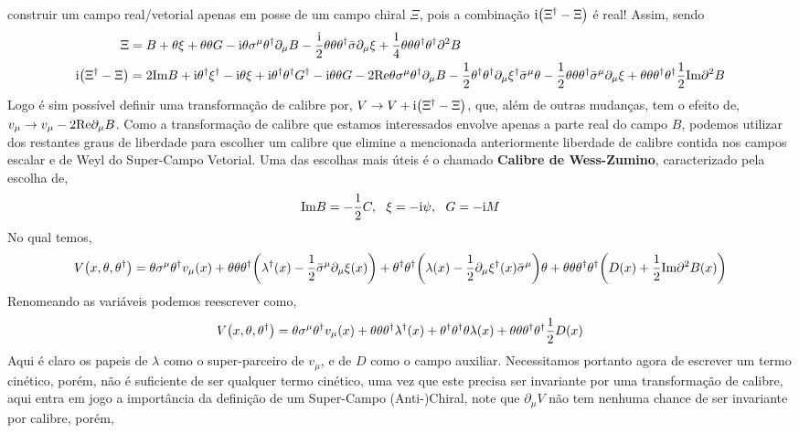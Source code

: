 construir um campo real/vetorial apenas em posse de um campo chiral $\Xi$, pois a combinação $\textnormal{i}\qty(\Xi^\dagger-\Xi)$ é real! Assim, sendo \begin{align*}
    \Xi&=B+\theta\xi+\theta\theta G-\textnormal{i}\theta\sigma^\mu\theta^\dagger\partial_\mu B-\frac{\textnormal{i}} 2\theta\theta\theta^\dagger{\bar\sigma}\partial_\mu\xi+\frac14\theta\theta\theta^\dagger\theta^\dagger\partial^2B\\
    \textnormal{i}\qty(\Xi^\dagger-\Xi)&=2\textnormal{Im}B+\textnormal{i}\theta^\dagger\xi^\dagger-\textnormal{i}\theta\xi+\textnormal{i}\theta^\dagger\theta^\dagger G^\dagger-\textnormal{i}\theta\theta G-2\textnormal{Re}\theta\sigma^\mu\theta^\dagger\partial_\mu B-\frac12\theta^\dagger\theta^\dagger\partial_\mu\xi^\dagger{\bar\sigma}^\mu\theta-\frac12\theta\theta\theta^\dagger{\bar\sigma^\mu}\partial_\mu\xi+\theta\theta\theta^\dagger\theta^\dagger\frac12\textnormal{Im}\partial^2B
\end{align*}
Logo é sim possível definir uma transformação de calibre por, $V\rightarrow V+\textnormal{i}\qty(\Xi^\dagger-\Xi)$, que, além de outras mudanças, tem o efeito de, $v_\mu\rightarrow v_\mu-2\textnormal{Re}\partial_\mu B$. Como a transformação de calibre que estamos interessados 
envolve apenas a parte real do campo $B$, podemos utilizar dos restantes graus de liberdade para escolher um calibre que elimine a mencionada anteriormente liberdade de calibre contida nos campos escalar e de Weyl do Super-Campo Vetorial. Uma das 
escolhas mais úteis é o chamado \textbf{Calibre de Wess-Zumino}, caracterizado pela escolha de,\[\textnormal{Im}B=-\frac12 C,\ \ \xi=-\im\psi,\ \ G=-\im M\] No qual temos, 
\[V\qty(x,\theta,\theta^\dagger)=\theta\sigma^\mu\theta^\dagger v_\mu\qty(x)+\theta\theta\theta^\dagger\qty(\lambda^\dagger\qty(x)-\frac12{\bar\sigma}^\mu\partial_\mu\xi\qty(x))+\theta^\dagger\theta^\dagger\qty(\lambda\qty(x)-\frac12\partial_\mu\xi^\dagger\qty(x){\bar\sigma}^\mu)\theta+\theta\theta\theta^\dagger\theta^\dagger\qty( D\qty(x)+\frac12\textnormal{Im}\partial^2 B\qty(x))\] Renomeando as variáveis podemos reescrever como,
\[V\qty(x,\theta,\theta^\dagger)=\theta\sigma^\mu\theta^\dagger v_\mu\qty(x)+\theta\theta\theta^\dagger\lambda^\dagger\qty(x)+\theta^\dagger\theta^\dagger\theta\lambda\qty(x)+\theta\theta\theta^\dagger\theta^\dagger\frac12D\qty(x)\] Aqui é claro os papeis de $\lambda$ como o super-parceiro de $v_\mu$, e de $D$ como o campo auxiliar. Necessitamos portanto agora de escrever um termo cinético, porém, não é suficiente de ser qualquer 
termo cinético, uma vez que este precisa ser invariante por uma transformação de calibre, aqui entra em jogo a importância da definição de um Super-Campo (Anti-)Chiral, note que $\partial_\mu V$ não tem nenhuma chance de ser invariante por calibre, porém, 
